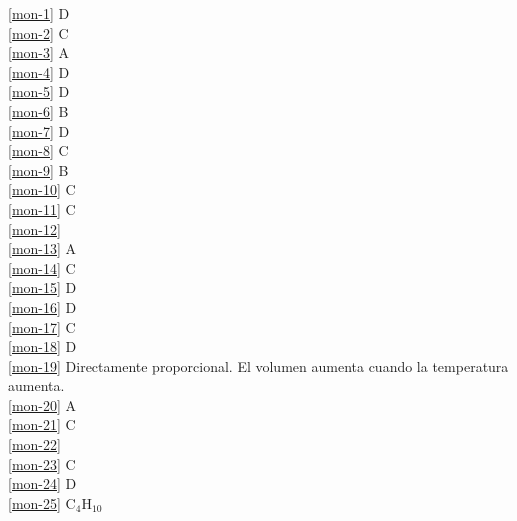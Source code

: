 \noindent \ref{mon-1} D\\
\ref{mon-2} C\\
\ref{mon-3} A\\
\ref{mon-4} D\\
\ref{mon-5} D\\
\ref{mon-6} B\\
\ref{mon-7} D\\
\ref{mon-8} C\\
\ref{mon-9} B\\
\ref{mon-10} C\\
\ref{mon-11} C\\
\ref{mon-12} \\
\ref{mon-13} A\\
\ref{mon-14} C\\
\ref{mon-15} D\\
\ref{mon-16} D\\
\ref{mon-17} C\\
\ref{mon-18} D\\
\ref{mon-19} Directamente proporcional. El volumen aumenta cuando la temperatura aumenta.\\
\ref{mon-20} A\\
\ref{mon-21} C\\
\ref{mon-22} \\
\ref{mon-23} C\\
\ref{mon-24} D\\
\ref{mon-25} C$_4$H$_{10}$\\



